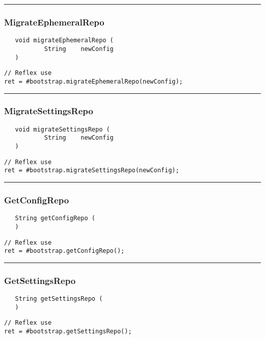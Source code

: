 \rule{15cm}{2pt}
\subsubsection{MigrateEphemeralRepo}
\label{Api:MigrateEphemeralRepo}
\begin{verbatim}
   void migrateEphemeralRepo (
           String    newConfig
   )
\end{verbatim}
\begin{lstlisting}[language=reflex]
// Reflex use
ret = #bootstrap.migrateEphemeralRepo(newConfig);
\end{lstlisting}



\rule{15cm}{2pt}
\subsubsection{MigrateSettingsRepo}
\label{Api:MigrateSettingsRepo}
\begin{verbatim}
   void migrateSettingsRepo (
           String    newConfig
   )
\end{verbatim}
\begin{lstlisting}[language=reflex]
// Reflex use
ret = #bootstrap.migrateSettingsRepo(newConfig);
\end{lstlisting}



\rule{15cm}{2pt}
\subsubsection{GetConfigRepo}
\label{Api:GetConfigRepo}
\begin{verbatim}
   String getConfigRepo (
   )
\end{verbatim}
\begin{lstlisting}[language=reflex]
// Reflex use
ret = #bootstrap.getConfigRepo();
\end{lstlisting}



\rule{15cm}{2pt}
\subsubsection{GetSettingsRepo}
\label{Api:GetSettingsRepo}
\begin{verbatim}
   String getSettingsRepo (
   )
\end{verbatim}
\begin{lstlisting}[language=reflex]
// Reflex use
ret = #bootstrap.getSettingsRepo();
\end{lstlisting}



